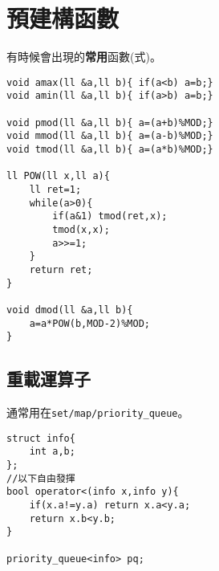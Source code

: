 \section{預建構函數}
    有時候會出現的\textbf{常用}函數(式)。

    \begin{lstlisting}[caption=可能會用的函數]
void amax(ll &a,ll b){ if(a<b) a=b;}
void amin(ll &a,ll b){ if(a>b) a=b;}

void pmod(ll &a,ll b){ a=(a+b)%MOD;}
void mmod(ll &a,ll b){ a=(a-b)%MOD;}
void tmod(ll &a,ll b){ a=(a*b)%MOD;}

ll POW(ll x,ll a){
    ll ret=1;
    while(a>0){
        if(a&1) tmod(ret,x);
        tmod(x,x);
        a>>=1;
    }
    return ret;
}

void dmod(ll &a,ll b){
    a=a*POW(b,MOD-2)%MOD;
}\end{lstlisting}

    \subsection{重載運算子}
    通常用在\verb|set/map/priority_queue|。
    \begin{lstlisting}[caption=運算子重載]
struct info{
    int a,b;
};
//以下自由發揮
bool operator<(info x,info y){
    if(x.a!=y.a) return x.a<y.a;
    return x.b<y.b;
}

priority_queue<info> pq;\end{lstlisting}
    